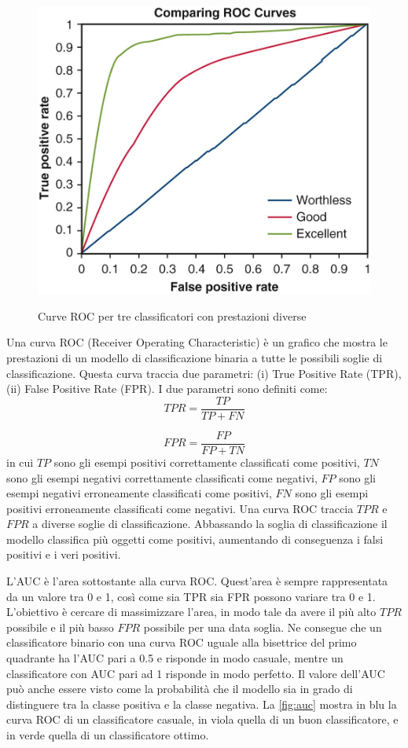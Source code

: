 \documentclass[12pt,italian]{report}
\begin{document}
\begin{figure}
  \centering
  \includegraphics[scale=0.50]{immagini/AUC.jpg}
  \caption{Curve ROC per tre classificatori con prestazioni diverse}
  \cite{auc-picture}
  \label{fig:auc}
\end{figure}

Una curva ROC (Receiver Operating Characteristic) è un grafico che mostra le prestazioni di un modello di classificazione binaria a tutte le possibili soglie di classificazione. Questa curva traccia due parametri: (i) True Positive Rate (TPR), (ii) False Positive Rate (FPR). I due parametri sono definiti come:
$$
TPR = \frac{TP}{TP+FN}
$$

$$
FPR = \frac{FP}{FP+TN}
$$
in cui $TP$ sono gli esempi positivi correttamente classificati come positivi, $TN$ sono gli esempi negativi correttamente classificati come negativi, $FP$ sono gli esempi negativi erroneamente classificati come positivi, $FN$ sono gli esempi positivi erroneamente classificati come negativi. Una curva ROC traccia $TPR$ e $FPR$ a diverse soglie di classificazione. Abbassando la soglia di classificazione il modello classifica più oggetti come positivi, aumentando di conseguenza i falsi positivi e i veri positivi. 

L'AUC è l'area sottostante alla curva ROC. Quest'area è sempre rappresentata da un valore tra 0 e 1, così come sia TPR sia FPR possono variare tra 0 e 1. L'obiettivo è cercare di massimizzare l'area, in modo tale da avere il più alto $TPR$ possibile e il più basso $FPR$ possibile per una data soglia. Ne consegue che un classificatore binario con una curva ROC uguale alla bisettrice del primo quadrante ha l'AUC pari a 0.5 e risponde in modo casuale,  mentre un classificatore con AUC pari ad 1 risponde in modo perfetto. Il valore dell'AUC può anche essere visto come la probabilità che il modello sia in grado di distinguere tra la classe positiva e la classe negativa. La \autoref{fig:auc} mostra in blu la curva ROC di un classificatore casuale, in viola quella di un buon classificatore, e in verde quella di un classificatore ottimo. 
\end{document}
